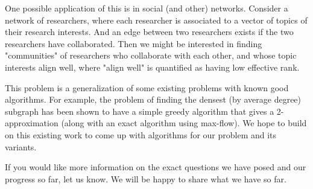 \documentclass{article}
\begin{document}
One possible application of this is in social (and other) networks. Consider a network of researchers, where each researcher is associated to a vector of topics of their research interests. And an edge between two researchers exists if the two researchers have collaborated. Then we might be interested in finding "communities" of researchers who collaborate with each other, and whose topic interests align well, where "align well" is quantified as having low effective rank.

This problem is a generalization of some existing problems with known good algorithms. For example, the problem of finding the densest (by average degree) subgraph has been shown to have a simple greedy algorithm that gives a 2-approximation (along with an exact algorithm using max-flow). We hope to build on this existing work to come up with algorithms for our problem and its variants.

If you would like more information on the exact questions we have posed and our progress so far, let us know. We will be happy to share what we have so far.
\end{document}
